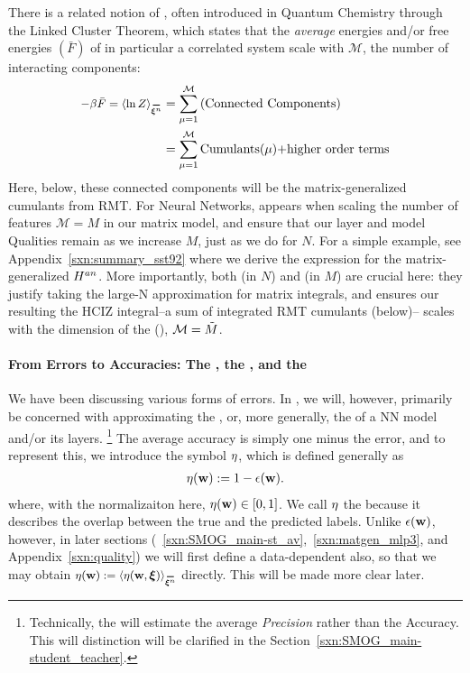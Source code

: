 There is a related notion of \emph{\SizeConsistency},
often introduced in Quantum Chemistry through the Linked Cluster Theorem\cite{Hubbard1959,Brandow1963},
which states that the \emph{average} energies and/or free energies $(\bar{F})$ of in particular a correlated system scale with $\mathcal{M}$,
the number of interacting components:
\begin{align}
  \label{eqn:LCT}
  -\beta \bar{F}=\langle \ln Z \rangle_{\AVGNDXIn} &= \sum_{\mu=1}^{\mathcal{M}}\text{(Connected Components)} \\ \nonumber
  &= \sum_{\mu=1}^{\mathcal{M}}\text{Cumulants($\mu$)+higher order terms} 
\end{align}
Here, below, these connected components will be the matrix-generalized cumulants from RMT.
For Neural Networks, \SizeConsistency appears when scaling the number of features $\mathcal{M}=M$ in our matrix model,
and ensure that our layer and model Qualities  remain \SizeConsistent as we increase $M$, just as we do for $N$.
For a simple example, see Appendix~\ref{sxn:summary_sst92}
 where we derive the expression for the matrix-generalized
\AnnealedHamiltonian $H^{an}$.  
More importantly, both \SizeExtensivity (in $N$) and \SizeConsistency (in $M$)
are crucial here:  they justify taking the large-N approximation for matrix integrals, and ensures
our resulting the HCIZ integral--a sum of integrated RMT cumulants (below)--
scales with the dimension of the \EffectiveCorrelationSpace (\ECS), $\mathcal{M}=\tilde{M}$.


\paragraph{From Errors to Accuracies: The \AverageGeneralizationAccuracy, the \Quality, and the \SelfOverlap}
We have been discussing various forms of errors.
In \SETOL, we will, however, primarily be concerned with approximating the \emph{\AverageGeneralizationAccuracy},
or, more generally, the \Quality of a NN model and/or its layers.
\footnote{Technically, the \Quality will estimate the average \emph{Precision} rather than the Accuracy.
This will distinction will be clarified in the Section~\ref{sxn:SMOG_main-student_teacher}.}
The average accuracy is simply one minus the error, and to represent this,
we introduce the symbol $\eta$, which is defined generally as
\begin{align}
 \label{eqn:def_eta}
 \eta({\mathbf{w}}) := 1-\epsilon({\mathbf{w}}).
\end{align}
where, with the normalizaiton here, $\eta({\mathbf{w}})\in[0,1]$.
We call $\eta$ the \emph{\SelfOverlap} because it describes the overlap between the true and the predicted labels.
Unlike $\epsilon({\mathbf{w}})$, however, in later sections
(~\ref{sxn:SMOG_main-st_av},~\ref{sxn:matgen_mlp3}, and Appendix~\ref{sxn:quality})
we will first define a data-dependent \SelfOverlap also, so that we may obtain
 $\ETA(\WVEC):=\langle\ETA(\WVEC,\XI)\rangle_{\AVGNDXIn}$ directly.
This will be made more clear later.

